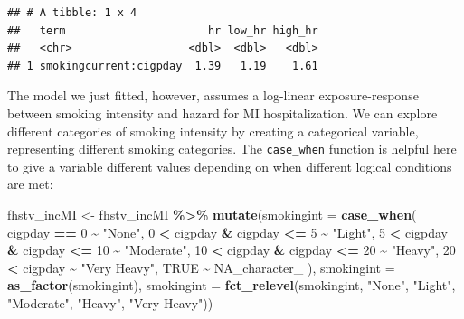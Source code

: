 \documentclass[
]{book}
\newenvironment{Shaded}{\begin{snugshade}}{\end{snugshade}}
\newcommand{\AttributeTok}[1]{\textcolor[rgb]{0.13,0.29,0.53}{#1}}
\newcommand{\ConstantTok}[1]{\textcolor[rgb]{0.56,0.35,0.01}{#1}}
\newcommand{\DecValTok}[1]{\textcolor[rgb]{0.00,0.00,0.81}{#1}}
\newcommand{\FunctionTok}[1]{\textcolor[rgb]{0.13,0.29,0.53}{\textbf{#1}}}
\newcommand{\NormalTok}[1]{#1}
\newcommand{\OtherTok}[1]{\textcolor[rgb]{0.56,0.35,0.01}{#1}}
\newcommand{\SpecialCharTok}[1]{\textcolor[rgb]{0.81,0.36,0.00}{\textbf{#1}}}
\newcommand{\StringTok}[1]{\textcolor[rgb]{0.31,0.60,0.02}{#1}}
\begin{document}
\begin{verbatim}
## # A tibble: 1 x 4
##   term                      hr low_hr high_hr
##   <chr>                  <dbl>  <dbl>   <dbl>
## 1 smokingcurrent:cigpday  1.39   1.19    1.61
\end{verbatim}

The model we just fitted, however, assumes a log-linear exposure-response between smoking intensity and hazard for MI hospitalization. We can explore different categories of smoking intensity by creating a categorical variable, representing different smoking categories. The \texttt{case\_when} function is helpful here to give a variable different values depending on when different logical conditions are met:

\begin{Shaded}
\begin{Highlighting}[]
\NormalTok{fhstv\_incMI }\OtherTok{\textless{}{-}}\NormalTok{ fhstv\_incMI }\SpecialCharTok{\%\textgreater{}\%} 
  \FunctionTok{mutate}\NormalTok{(}\AttributeTok{smokingint =} \FunctionTok{case\_when}\NormalTok{(}
\NormalTok{    cigpday }\SpecialCharTok{==} \DecValTok{0} \SpecialCharTok{\textasciitilde{}} \StringTok{"None"}\NormalTok{, }
    \DecValTok{0} \SpecialCharTok{\textless{}}\NormalTok{ cigpday }\SpecialCharTok{\&}\NormalTok{ cigpday }\SpecialCharTok{\textless{}=} \DecValTok{5} \SpecialCharTok{\textasciitilde{}} \StringTok{"Light"}\NormalTok{, }
    \DecValTok{5} \SpecialCharTok{\textless{}}\NormalTok{ cigpday }\SpecialCharTok{\&}\NormalTok{ cigpday }\SpecialCharTok{\textless{}=} \DecValTok{10} \SpecialCharTok{\textasciitilde{}} \StringTok{"Moderate"}\NormalTok{, }
    \DecValTok{10} \SpecialCharTok{\textless{}}\NormalTok{ cigpday }\SpecialCharTok{\&}\NormalTok{ cigpday }\SpecialCharTok{\textless{}=} \DecValTok{20} \SpecialCharTok{\textasciitilde{}} \StringTok{"Heavy"}\NormalTok{, }
    \DecValTok{20} \SpecialCharTok{\textless{}}\NormalTok{ cigpday }\SpecialCharTok{\textasciitilde{}} \StringTok{"Very Heavy"}\NormalTok{,}
    \ConstantTok{TRUE} \SpecialCharTok{\textasciitilde{}} \ConstantTok{NA\_character\_}
\NormalTok{                                ),}
    \AttributeTok{smokingint =} \FunctionTok{as\_factor}\NormalTok{(smokingint), }
    \AttributeTok{smokingint =} \FunctionTok{fct\_relevel}\NormalTok{(smokingint, }
                          \StringTok{"None"}\NormalTok{, }\StringTok{"Light"}\NormalTok{, }\StringTok{"Moderate"}\NormalTok{, }\StringTok{"Heavy"}\NormalTok{, }\StringTok{"Very Heavy"}\NormalTok{))}
\end{Highlighting}
\end{Shaded}
\end{document}
